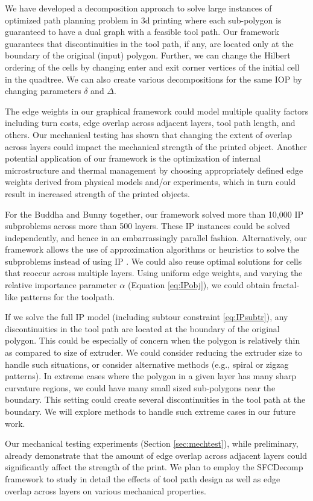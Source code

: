 We have developed a decomposition approach to solve large instances of optimized path planning problem in 3d printing where each sub-polygon is guaranteed to have a dual graph with a feasible tool path. 
Our framework guarantees that discontinuities in the tool path, if any, are located only at the boundary of the original (input) polygon.
Further, we can change the Hilbert ordering of the cells by changing enter and exit corner vertices of the initial cell in the quadtree.
We can also create various decompositions for the same IOP by changing parameters $\delta$ and $\Delta$.

The edge weights in our graphical framework could model multiple quality factors including turn costs, edge overlap across adjacent layers, tool path length, and others.
Our mechanical testing has shown that changing the extent of overlap across layers could impact the mechanical strength of the printed object.
Another potential application of our framework is the optimization of internal microstructure and thermal management by choosing appropriately defined edge weights derived from physical models and/or experiments, which in turn could result in increased strength of the printed objects.

For the Buddha and Bunny together, our framework solved more than 10,000 IP subproblems across more than 500 layers.
These IP instances could be solved independently, and hence in an embarrassingly parallel fashion.
Alternatively, our framework allows the use of approximation algorithms or heuristics to solve the subproblems instead of using IP \cite{ApBiChCo2007}.
We could also reuse optimal solutions for cells that reoccur across multiple layers.
Using uniform edge weights, and varying the relative importance parameter $\alpha$ (Equation \ref{eq:IPobj}), we could obtain fractal-like patterns for the toolpath.  

If we solve the full IP model (including subtour constraint \ref{eq:IPsubtr}), any discontinuities in the tool path are located at the boundary of the original polygon. 
This could be especially of concern when the polygon is relatively thin as compared to size of extruder.
We could consider reducing the extruder size to handle such situations, or consider alternative methods (e.g., spiral or zigzag patterns).
In extreme cases where the polygon in a given layer has many sharp curvature regions, we could have many small sized sub-polygons near the boundary.
This setting could create several discontinuities in the tool path at the boundary.
We will explore methods to handle such extreme cases in our future work.

Our mechanical testing experiments (Section \ref{sec:mechtest}), while preliminary, already demonstrate that the amount of edge overlap across adjacent layers could significantly affect the strength of the print.
We plan to employ the SFCDecomp framework to study in detail the effects of tool path design as well as edge overlap across layers on various mechanical properties.





